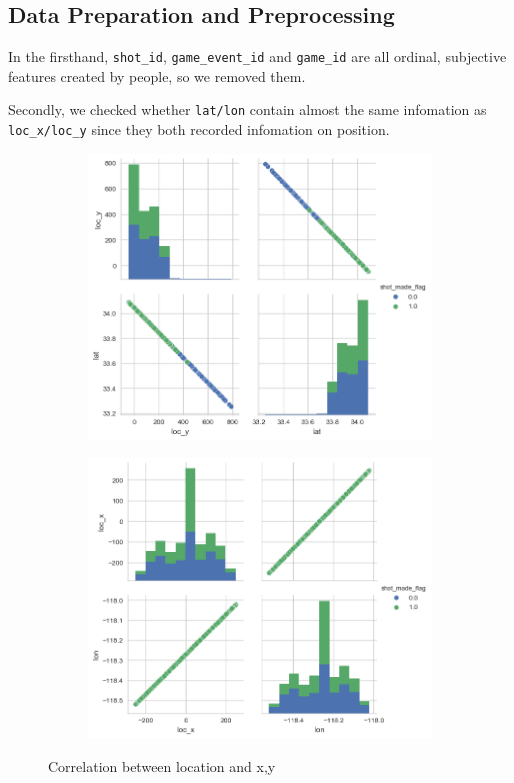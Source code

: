 \documentclass[a4paper,11pt,onecolumn,twoside]{article}
\begin{document}
\subsection{Data Preparation and Preprocessing}
In the firsthand, \texttt{shot\_id}, \texttt{game\_event\_id} and \texttt{game\_id} are all ordinal, subjective features created by people, so we removed them.\par
Secondly, we checked whether \texttt{lat/lon} contain almost the same infomation as \texttt{loc\_x/loc\_y} since they both recorded infomation on position.
\begin{figure}[htbp]
	\centering
	\begin{subfigure}[t]{0.45\textwidth}
		\centering
		\includegraphics[width=1.0\textwidth]{lat_locy.png}
	\end{subfigure}
	\quad
	\begin{subfigure}[t]{0.45\textwidth}
		\centering
		\includegraphics[width=1.0\textwidth]{lon_locx.png}
	\end{subfigure}	
\caption{Correlation between location and x,y}
\end{figure}
\end{document}
